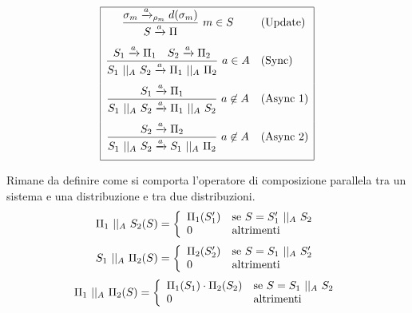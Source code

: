 $$
\begin{array}{|cl|}
	\hline
	\displaystyle{\frac{\sigma_m \xrightarrow{a}_{\rho_m} d(\sigma_m)}{S \xrightarrow{a} \Pi}\ m \in S} & \mbox{(Update)} \\[.5cm]
	\displaystyle{\frac{S_1 \xrightarrow{a} \Pi_1 \quad S_2 \xrightarrow{a} \Pi_2}{S_1 \mbox{ }||_{A}\mbox{ }S_2 \xrightarrow{a} \Pi_1 \mbox{ }||_{A}\mbox{ }\Pi_2}\ a \in A} & \mbox{(Sync)} \\[.5cm]
	\displaystyle{\frac{S_1 \xrightarrow{a} \Pi_1}{S_1 \mbox{ }||_{A}\mbox{ }S_2 \xrightarrow{a} \Pi_1 \mbox{ }||_{A}\mbox{ }S_2}\ a \not\in A} & \mbox{(Async\ 1)} \\[.5cm]
	\displaystyle{\frac{S_2 \xrightarrow{a} \Pi_2}{S_1 \mbox{ }||_{A}\mbox{ }S_2 \xrightarrow{a} S_1 \mbox{ }||_{A}\mbox{ }\Pi_2}\ a \not\in A} & \mbox{(Async\ 2)} \\[.5cm]
	\hline
\end{array}
$$

Rimane da definire come si comporta l'operatore di composizione parallela tra un sistema e una distribuzione e tra due distribuzioni.
$$
\Pi_1 \mbox{ }||_{A}\mbox{ } S_2 (S) = \left\{
\begin{array}{ll}
	\Pi_1(S_1')	& \mbox{se } S = S_1' \mbox{ }||_{A}\mbox{ } S_2 \\
	0			& \mbox{altrimenti} \\
\end{array}
\right.
$$
$$
S_1 \mbox{ }||_{A}\mbox{ } \Pi_2 (S) = \left\{
\begin{array}{ll}
	\Pi_2(S_2')	& \mbox{se } S = S_1 \mbox{ }||_{A}\mbox{ } S_2' \\
	0			& \mbox{altrimenti} \\
\end{array}
\right.
$$
$$
\Pi_1 \mbox{ }||_{A}\mbox{ } \Pi_2 (S) = \left\{
\begin{array}{ll}
	\Pi_1(S_1)\cdot\Pi_2(S_2)	& \mbox{se } S = S_1 \mbox{ }||_{A}\mbox{ } S_2 \\
	0			& \mbox{altrimenti} \\
\end{array}
\right.
$$


